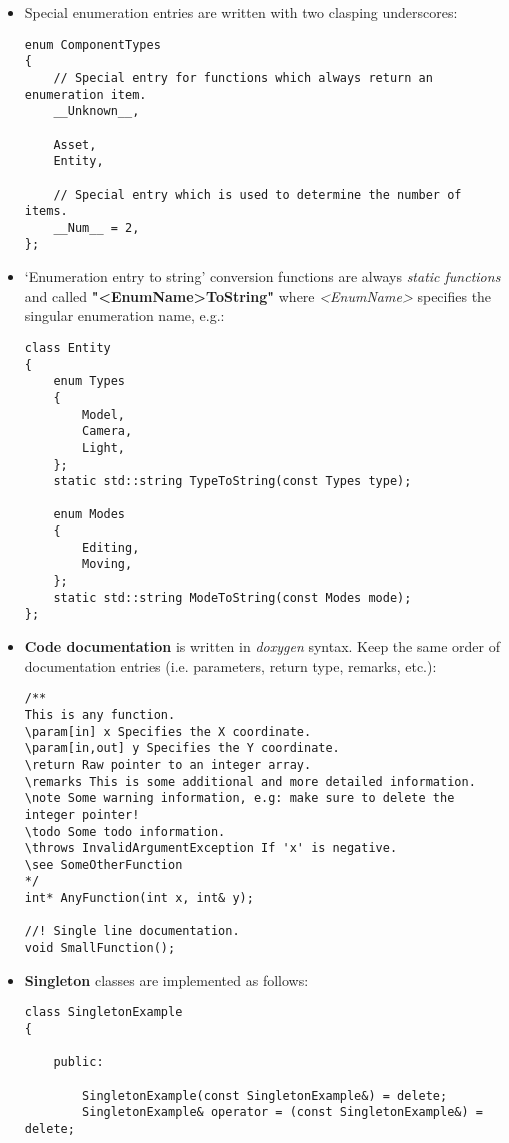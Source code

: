 \documentclass{article}
\begin{document}
\begin{itemize}
\item
Special enumeration entries are written with two clasping underscores:

\begin{lstlisting}
enum ComponentTypes
{
	// Special entry for functions which always return an enumeration item.
	__Unknown__,
	
	Asset,
	Entity,
	
	// Special entry which is used to determine the number of items.
	__Num__ = 2,
};
\end{lstlisting}

\item
`Enumeration entry to string' conversion functions are always \textit{static functions} and
called \textbf{"<EnumName>ToString"} where \textit{<EnumName>} specifies the singular enumeration name, e.g.:

\begin{lstlisting}
class Entity
{
	enum Types
	{
		Model,
		Camera,
		Light,
	};
	static std::string TypeToString(const Types type);
	
	enum Modes
	{
		Editing,
		Moving,
	};
	static std::string ModeToString(const Modes mode);
};
\end{lstlisting}

\item
\textbf{Code documentation} is written in \textit{doxygen} syntax.
Keep the same order of documentation entries (i.e. parameters, return type, remarks, etc.):

\begin{lstlisting}
/**
This is any function.
\param[in] x Specifies the X coordinate.
\param[in,out] y Specifies the Y coordinate.
\return Raw pointer to an integer array.
\remarks This is some additional and more detailed information.
\note Some warning information, e.g: make sure to delete the integer pointer!
\todo Some todo information.
\throws InvalidArgumentException If 'x' is negative.
\see SomeOtherFunction
*/
int* AnyFunction(int x, int& y);

//! Single line documentation.
void SmallFunction();
\end{lstlisting}

\item
\textbf{Singleton} classes are implemented as follows:

\begin{lstlisting}
class SingletonExample
{

	public:
		
		SingletonExample(const SingletonExample&) = delete;
		SingletonExample& operator = (const SingletonExample&) = delete;
		

\end{lstlisting}
\end{itemize}
\end{document}
